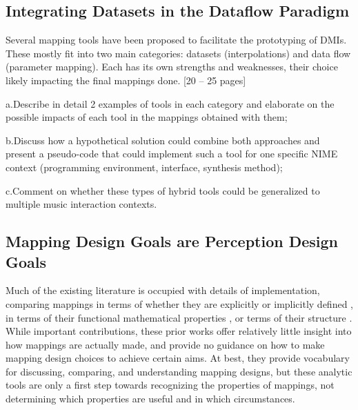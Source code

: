 \documentclass[main.tex]{subfiles}
\begin{document}
    
	
	\newpage{}
	
	\begin{singlespace}
        \chapter{Integrating Datasets in the Dataflow Paradigm}\label{chapter:setflow}

        Several mapping tools have been proposed to facilitate the prototyping of DMIs. These mostly fit into two main categories: datasets (interpolations) and data flow (parameter mapping). Each has its own strengths and weaknesses, their choice likely impacting the final mappings done. [20 – 25 pages]

        a.Describe in detail 2 examples of tools in each category and elaborate on the possible impacts of each tool in the mappings obtained with them;

        b.Discuss how a hypothetical solution could combine both approaches and present a pseudo-code that could implement such a tool for one specific NIME context (programming environment, interface, synthesis method);

        c.Comment on whether these types of hybrid tools could be generalized to multiple music interaction contexts.

	\end{singlespace}
	
	\newpage{}
	
\section{Mapping Design Goals are Perception Design Goals}

Much of the existing literature is occupied with details of implementation,
comparing mappings in terms of whether they are explicitly or implicitly
defined \cite{Hunt2000, Arfib2002}, in terms of their functional mathematical
properties \cite{nort2004nime_geometric-properties}, or terms of their structure \cite{Momeni2006}.
While important contributions, these prior works offer relatively little
insight into how mappings are actually made, and provide no guidance on how to
make mapping design choices to achieve certain aims.  At best, they provide
vocabulary for discussing, comparing, and understanding mapping designs, but
these analytic tools are only a first step towards recognizing the properties
of mappings, not determining which properties are useful and in which
circumstances.
\end{document}
